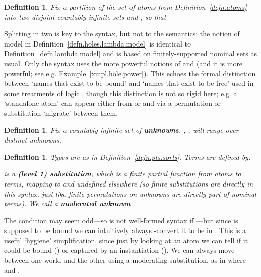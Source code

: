 \documentclass[submission,copyright]{eptcs}
\newtheorem{defn}[thrm]{Definition}
\newcommand{\deffont}[1]{\textbf{#1}}
\begin{document}
\begin{defn}
\label{defn.partition}
Fix a partition of the set of atoms from Definition~\ref{defn.atoms} into two disjoint countably infinite sets  and , so that  
\end{defn}

Splitting  in two is key to the syntax, but not to the semantics: the notion of model in Definition~\ref{defn.holes.lambda.model} is identical to Definition~\ref{defn.lambda.model} and is based on finitely-supported nominal sets as usual.
Only the syntax uses the more powerful notions of  and  (and it is more powerful; see e.g. Example~\ref{xmpl.hole.power}).
This echoes the formal distinction between `names that exist to be bound' and `names that exist to be free' used in some treatments of logic \cite{heijenoort:fregsb,smullyan:firol}, though this distinction is not so rigid here; e.g. a `standalone atom'  can appear either from  or  and via a permutation or substitution `migrate' between them.





\begin{defn}
Fix a countably infinite set of \deffont{unknowns}.
, ,  will range over distinct unknowns.
\end{defn}

\begin{defn}
\label{defn.holes.sorts}
Types are as in Definition~\ref{defn.pts.sorts}.
Terms are defined by:

 is a \deffont{(level 1) substitution}, which is a finite partial function from atoms to terms, mapping  to  and undefined elsewhere (so finite substitutions are directly in this syntax, just like finite permutations on unknowns  are directly part of nominal terms).
We call  a \deffont{moderated unknown}.
\end{defn}
The condition  may seem odd---so  is not well-formed syntax if ---but since  is supposed to be bound we can intuitively always -convert it to be in .  This is a useful `hygiene' simplification, since just by looking at an atom  we can tell if it could be bound () or captured by an instantiation ().
We can always move between one world and the other using a moderating substitution, as in  where  and . 
\end{document}
